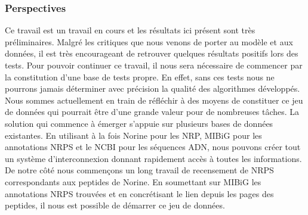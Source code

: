 \subsubsection{Perspectives}

Ce travail est un travail en cours et les résultats ici présent sont très préliminaires.
Malgré les critiques que nous venons de porter au modèle et aux données, il est très encourageant de retrouver quelques résultats positifs lors des tests.
Pour pouvoir continuer ce travail, il nous sera nécessaire de commencer par la constitution d'une base de tests propre.
En effet, sans ces tests nous ne pourrons jamais déterminer avec précision la qualité des algorithmes développés.
Nous sommes actuellement en train de réfléchir à des moyens de constituer ce jeu de données qui pourrait être d'une grande valeur pour de nombreuses tâches.
La solution qui commence à émerger s'appuie sur plusieurs bases de données existantes.
En utilisant à la fois Norine pour les NRP, MIBiG pour les annotations NRPS et le NCBI pour les séquences ADN, nous pouvons créer tout un système d'interconnexion donnant rapidement accès à toutes les informations.
De notre côté nous commençons un long travail de recensement de NRPS correspondants aux peptides de Norine.
En soumettant sur MIBiG les annotations NRPS trouvées et en concrétisant le lien depuis les pages des peptides, il nous est possible de démarrer ce jeu de données.